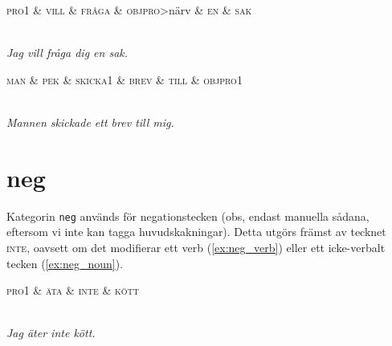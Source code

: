 \documentclass[11pt,a4paper]{article}
\begin{document}
\begin{example}
\label{ex:det_num}
\begin{dependency}[theme = simple]
   \begin{deptext}[column sep=1em]
      \textsc{pro1} \& \textsc{vill} \& \textsc{fråga} \& \textsc{objpro}{\textgreater}närv \& \textsc{en} \& \textsc{sak} \\
   \end{deptext}
\end{dependency}
\\
\textit{Jag vill fråga dig en sak.}
\end{example}

\begin{example}
\label{ex:det_pek}
\begin{dependency}[theme = simple]
   \begin{deptext}[column sep=1em]
      \textsc{man} \& \textsc{pek} \& \textsc{skicka1} \& \textsc{brev} \& \textsc{till} \& \textsc{objpro1} \\
   \end{deptext}
\end{dependency}
\\
\textit{Mannen skickade ett brev till mig.}
\end{example}


\section{neg}
\label{sec:neg}
Kategorin \texttt{neg} används för negationstecken (obs, endast manuella sådana, eftersom vi inte kan tagga huvudskakningar). Detta utgörs främst av tecknet \textsc{inte}, oavsett om det modifierar ett verb (\ref{ex:neg_verb}) eller ett icke-verbalt tecken (\ref{ex:neg_noun}). 

\begin{example}
\label{ex:neg_verb}
\begin{dependency}[theme = simple]
   \begin{deptext}[column sep=1em]
      \textsc{pro1}  \& \textsc{äta} \& \textsc{inte} \& \textsc{kött} \\
   \end{deptext}
\end{dependency}
\\
\textit{Jag äter inte kött.}
\end{example}
\end{document}
